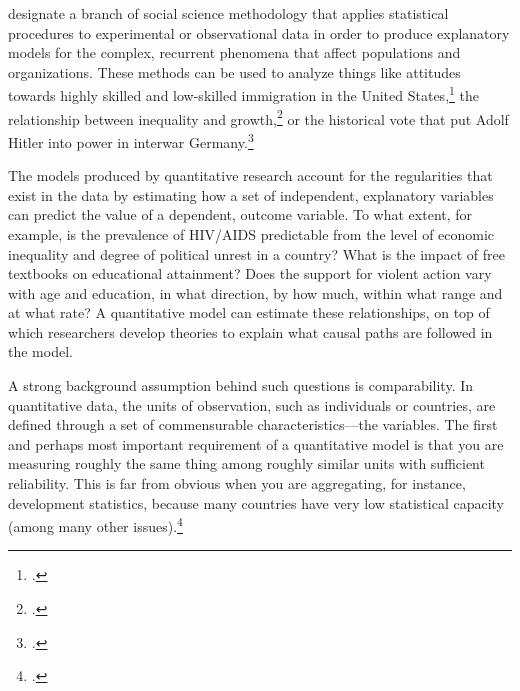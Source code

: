 %
%

%
	\label{sec:quantitative-methods}
  
	 designate a branch of social science methodology that applies statistical procedures to experimental or observational data in order to produce explanatory models for the complex, recurrent phenomena that affect populations and organizations. These methods can be used to analyze things like attitudes towards highly skilled and low-skilled immigration in the United States,\footcite{HainmuellerHiscox:2010a} the relationship between inequality and growth,\footcite{BanerjeeDuflo:2003} or the historical vote that put Adolf Hitler into power in interwar Germany.\footcite{KingRosen:2008a}%


	The models produced by quantitative research account for the regularities that exist in the data by estimating how a set of independent, explanatory variables can predict the value of a dependent, outcome variable. To what extent, for example, is the prevalence of HIV/AIDS predictable from the level of economic inequality and degree of political unrest in a country? What is the impact of free textbooks on educational attainment? Does the support for violent action vary with age and education, in what direction, by how much, within what range and at what rate? A quantitative model can estimate these relationships, on top of which researchers develop theories to explain what causal paths are followed in the model.%

	A strong background assumption behind such questions is comparability. In quantitative data, the units of observation, such as individuals or countries, are defined through a set of commensurable characteristics—the variables. The first and perhaps most important requirement of a quantitative model is that you are measuring roughly the same thing among roughly similar units with sufficient reliability. This is far from obvious when you are aggregating, for instance, development statistics, because many countries have very low statistical capacity (among many other issues).\footcite{Jerven:2013a}%

